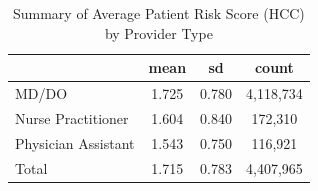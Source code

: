 \begin{table}[htbp]\centering
\def\sym#1{\ifmmode^{#1}\else\(^{#1}\)\fi}
\caption{Summary of Average Patient Risk Score (HCC) by Provider Type}
\begin{tabular}{l*{1}{ccc}}
\toprule
                    &        mean&          sd&       count\\
\midrule
MD/DO               &       1.725&       0.780&   4,118,734\\
Nurse Practitioner  &       1.604&       0.840&     172,310\\
Physician Assistant &       1.543&       0.750&     116,921\\
Total               &       1.715&       0.783&   4,407,965\\
\bottomrule
\end{tabular}
\end{table}
